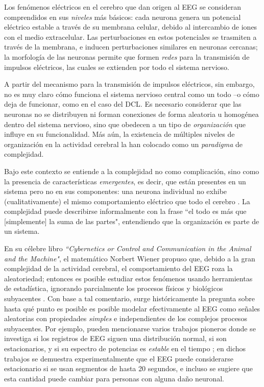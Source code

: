 \documentclass[12pt,letterpaper]{book}
\begin{document}
Los fenómenos eléctricos en el cerebro que dan origen al EEG se consideran comprendidos en sus \textit{niveles} más básicos: cada neurona genera un potencial eléctrico estable a través de su membrana celular, debido al intercambio de iones con el medio extracelular.
%
Las perturbaciones en estos {potenciales} se trasmiten a través de la membrana, e inducen perturbaciones similares en neuronas cercanas; la morfología de las neuronas permite que formen \textit{redes} para la transmisión de impulsos eléctricos, las cuales se extienden por todo el sistema nervioso.

A partir del mecanismo para la transmisión de impulsos eléctricos, sin embargo, no es muy claro cómo funciona el sistema nervioso central como un todo --o cómo deja de funcionar, como en el caso del DCL.
%
Es necesario considerar que las neuronas no se distribuyen ni forman conexiones de forma aleatoria u homogénea dentro del sistema nervioso, sino que obedecen a un tipo de \textit{organización} que influye en su funcionalidad.
%
Más aún, la existencia de múltiples niveles de organización en la actividad cerebral la han colocado como un \textit{paradigma} de complejidad.

Bajo este contexto se entiende a la complejidad no como complicación, sino como la presencia de características \textit{emergentes}, es decir, que están presentes en un sistema pero no en sus componentes: una neurona individual no exhibe (cualitativamente) el mismo comportamiento eléctrico que todo el cerebro \cite{Werner09}.
%
La complejidad puede describirse informalmente con la frase ``el todo es más que [simplemente] la suma de las partes", entendiendo que la organización es parte de un sistema.

En su célebre libro \textit{``Cybernetics or Control and Communication in the Animal and the Machine"}, el matemático Norbert Wiener propuso que, debido a la gran complejidad de la actividad cerebral, el comportamiento del EEG roza la aleatoriedad; entonces es posible estudiar estos fenómenos usando herramientas de estadística, ignorando parcialmente los procesos físicos y biológicos subyacentes
\cite{wiener61}.
%
Con base a tal comentario, surge históricamente la pregunta sobre hasta qué punto es posible es posible modelar efectivamente al EEG como señales aleatorias con propiedades \textit{simples} e independientes de los complejos procesos subyacentes.
%
Por ejemplo, pueden mencionarse varios trabajos pioneros donde se investiga si los registros de EEG siguen una distribución normal, si son estacionarios, y si su espectro de potencias es \textit{estable} en el tiempo \cite{Cohen77,Kawabata73,McEwen75,Sugimoto78}; en dichos trabajos se demuestra experimentalmente que el EEG puede considerarse estacionario si se usan segmentos de hasta 20 segundos, e incluso se sugiere que esta cantidad puede cambiar para personas con alguna daño neuronal.
\end{document}
